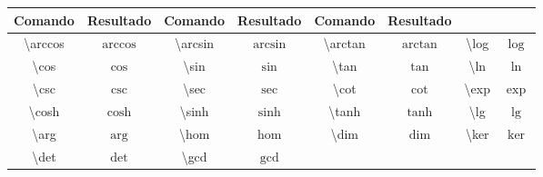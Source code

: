% 
% 
% 
% 
% 
\begin{tabular}{cc|cc|cc|cc}
    \hline
    Comando & Resultado & Comando & Resultado & Comando & Resultado \\ \hline
    \textbackslash\textsf{arccos} & $\arccos$ & \textbackslash\textsf{arcsin} & $\arcsin$ & \textbackslash\textsf{arctan} & $\arctan$ & \textbackslash\textsf{log} & $\log$ \\
    \textbackslash\textsf{cos} & $\cos$ & \textbackslash\textsf{sin} & $\sin$ & \textbackslash\textsf{tan} & $\tan$ & \textbackslash\textsf{ln} & $\ln$ \\
    \textbackslash\textsf{csc} & $\csc$ & \textbackslash\textsf{sec} & $\sec$ & \textbackslash\textsf{cot} & $\cot$ & \textbackslash\textsf{exp} & $\exp$ \\
    \textbackslash\textsf{cosh} & $\cosh$ & \textbackslash\textsf{sinh} & $\sinh$ & \textbackslash\textsf{tanh} & $\tanh$ & \textbackslash\textsf{lg} & $\lg$ \\
    \textbackslash\textsf{arg} & $\arg$ & \textbackslash\textsf{hom} & $\hom$ & \textbackslash\textsf{dim} & $\dim$ & \textbackslash\textsf{ker} & $\ker$ \\ \textbackslash\textsf{det} & $\det$ & \textbackslash\textsf{gcd} & $\gcd$ & & & & \\ \hline
\end{tabular}
